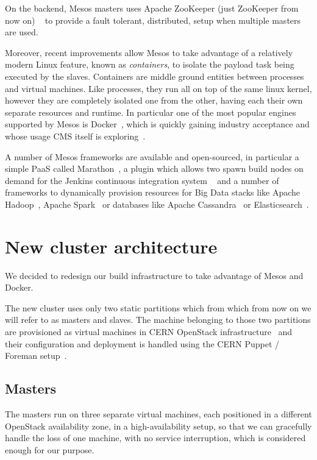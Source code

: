 \documentclass[a4paper]{jpconf}
\begin{document}
On the backend, Mesos masters uses Apache ZooKeeper (just ZooKeeper from now on)
~\cite{ZOOKEEPER} to provide a fault tolerant, distributed, setup when multiple
masters are used.

Moreover, recent improvements allow Mesos to take advantage of a relatively
modern Linux feature, known as \textit{containers}, to isolate the payload task
being executed by the slaves. Containers are middle ground entities between
processes and virtual machines. Like processes, they run all on top of the same
linux kernel, however they are completely isolated one from the other, having
each their own separate resources and runtime. In particular one of the most
popular engines supported by Mesos is Docker~\cite{DOCKER}, which is quickly
gaining industry acceptance and whose usage CMS itself is
exploring~\cite{DOCKERPAPER}.

A number of Mesos frameworks are available and open-sourced, in particular a
simple PaaS called Marathon~\cite{MARATHON}, a plugin which allows two spawn
build nodes on demand for the Jenkins continuous integration system
~\cite{MESOSJENKINS} and a number of frameworks to dynamically provision
resources for Big Data stacks like Apache Hadoop~\cite{MESOSHADOOP}, Apache
Spark~\cite{MESOSSPARK} or databases like Apache Cassandra~\cite{MESOSCASSANDRA}
or Elasticsearch~\cite{MESOSELASTIC}.

\section{New cluster architecture}

We decided to redesign our build infrastructure to take advantage of Mesos and
Docker.

The new cluster uses only two static partitions which from which from now on we
will refer to as masters and slaves. The machine belonging to those two
partitions are provisioned as virtual machines in CERN OpenStack
infrastructure~\cite{CERNOPENSTACK} and their configuration and deployment is
handled using the CERN Puppet / Foreman setup~\cite{CERNCFG}.

\subsection{Masters}

The masters run on three separate virtual machines, each positioned in a
different OpenStack availability zone, in a high-availability setup, so that we
can gracefully handle the loss of one machine, with no service interruption,
which is considered enough for our purpose.
\end{document}
